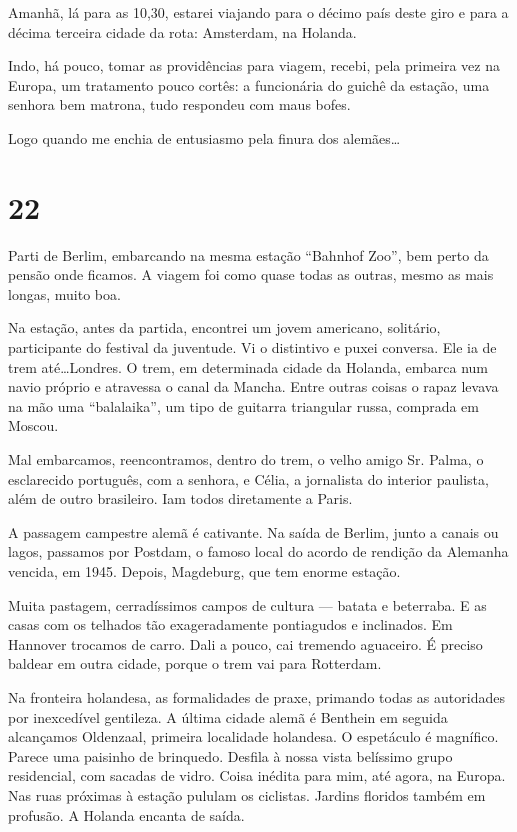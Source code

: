Amanhã, lá para as 10,30, estarei viajando para o décimo país deste giro e para a décima terceira cidade da rota: Amsterdam, na Holanda.

Indo, há pouco, tomar as providências para viagem, recebi, pela primeira vez na Europa, um tratamento pouco cortês: a funcionária do guichê da estação, uma senhora bem matrona, tudo respondeu com maus bofes.

Logo quando me enchia de entusiasmo pela finura dos alemães\ldots

\section*{22 \adfflatleafright {}}
Parti de Berlim, embarcando na mesma estação ``Bahnhof Zoo'', bem perto da pensão onde ficamos. A viagem foi como quase todas as outras, mesmo as mais longas, muito boa.

Na estação, antes da partida, encontrei um jovem americano, solitário, participante do festival da juventude. Vi o distintivo e puxei conversa. Ele ia de trem até\ldots Londres. O trem, em determinada cidade da Holanda, embarca num navio próprio e atravessa o canal da Mancha. Entre outras coisas o rapaz levava na mão uma ``balalaika'', um tipo de guitarra triangular russa, comprada em Moscou.

Mal embarcamos, reencontramos, dentro do trem, o velho amigo Sr. Palma, o esclarecido português, com a senhora, e Célia, a jornalista do interior paulista, além de outro brasileiro. Iam todos diretamente a Paris.

A passagem campestre alemã é cativante. Na saída de Berlim, junto a canais ou lagos, passamos por Postdam, o famoso local do acordo de rendição da Alemanha vencida, em 1945. Depois, Magdeburg, que tem enorme estação.

Muita pastagem, cerradíssimos campos de cultura --- batata e beterraba. E as casas com os telhados tão exageradamente pontiagudos e inclinados. Em Hannover trocamos de carro. Dali a pouco, cai tremendo aguaceiro. É preciso baldear em outra cidade, porque o trem vai para Rotterdam.

Na fronteira holandesa, as formalidades de praxe, primando todas as autoridades por inexcedível gentileza. A última cidade alemã é Benthein em seguida alcançamos Oldenzaal, primeira localidade holandesa. O espetáculo é magnífico. Parece uma paisinho de brinquedo. Desfila à nossa vista belíssimo grupo residencial, com sacadas de vidro. Coisa inédita para mim, até agora, na Europa. Nas ruas próximas à estação pululam os ciclistas. Jardins floridos também em profusão. A Holanda encanta de saída.

